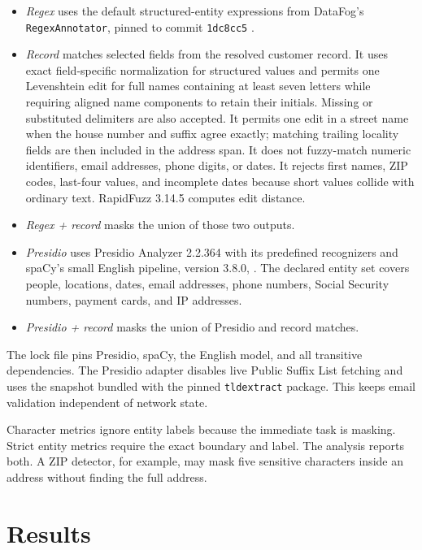 \documentclass[11pt]{article}
\begin{document}
\begin{itemize}
    \item \emph{Regex} uses the default structured-entity expressions from
    DataFog's \texttt{RegexAnnotator}, pinned to commit \texttt{1dc8cc5}
    \citep{datafog}.
    \item \emph{Record} matches selected fields from the resolved customer
    record. It uses exact field-specific normalization for structured values
    and permits one Levenshtein edit for full names containing at least seven
    letters while requiring aligned name components to retain their initials.
    Missing or substituted delimiters are also accepted. It permits one edit in
    a street name when the house number and suffix agree exactly; matching
    trailing locality fields are then included in the address span. It does not fuzzy-match numeric identifiers, email
    addresses, phone digits, or dates. It rejects first names, ZIP codes,
    last-four values, and incomplete dates because short values collide with
    ordinary text. RapidFuzz 3.14.5 computes edit distance.
    \item \emph{Regex + record} masks the union of those two outputs.
    \item \emph{Presidio} uses Presidio Analyzer 2.2.364 with its predefined
    recognizers and spaCy's small English pipeline, version 3.8.0,
    \citep{presidio,spacyModel}. The declared entity set covers people,
    locations, dates, email addresses, phone numbers, Social Security numbers,
    payment cards, and IP addresses.
    \item \emph{Presidio + record} masks the union of Presidio and record
    matches.
\end{itemize}

The lock file pins Presidio, spaCy, the English model, and all transitive
dependencies. The Presidio adapter disables live Public Suffix List fetching
and uses the snapshot bundled with the pinned \texttt{tldextract} package. This
keeps email validation independent of network state.

Character metrics ignore entity labels because the immediate task is masking.
Strict entity metrics require the exact boundary and label. The analysis reports
both. A ZIP detector, for example, may mask five sensitive characters inside an
address without finding the full address.

\section*{Results}
\end{document}
